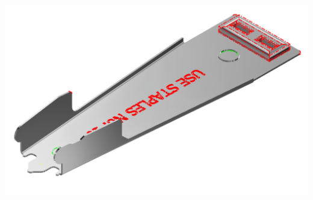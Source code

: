 \begin{minipage}{\linewidth}
\begin{minipage}[c]{0.62\linewidth}
\includegraphics[width=\linewidth,valign=t]{../Common/images/StaplerLower_PhISelections_1_model}
 \label{fig:results:staplerlowerphImodel}



\end{minipage}
\end{minipage}
